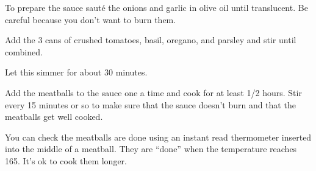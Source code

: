 \begin{IngredientsAndSteps}
    {}

    {
        To prepare the sauce sauté the onions and garlic in olive oil until translucent. Be careful because you don't want to burn
        them.

        Add the 3 cans of crushed tomatoes, basil, oregano, and parsley and stir until combined.

        Let this simmer for about 30 minutes.
    }

    {
        Add the meatballs to the sauce one a time and cook for at least 1/2 hours. Stir every 15 minutes or so to make
        sure that the sauce doesn't burn and that the meatballs get well cooked.

        You can check the meatballs are done using an instant read thermometer inserted into the middle of a meatball.
        They are ``done'' when the temperature reaches 165\Degrees[F]. It's ok to cook them longer.
    }
\end{IngredientsAndSteps}

%
%
%
%
\newpage



